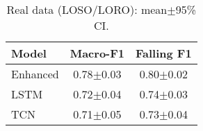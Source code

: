 \begin{table}[t]
\centering
\caption{Real data (LOSO/LORO): mean$\pm$95\% CI.}
\begin{tabular}{lcc}
\toprule
Model & Macro-F1 & Falling F1 \\
\midrule
Enhanced & 0.78$\pm$0.03 & 0.80$\pm$0.02 \\
LSTM & 0.72$\pm$0.04 & 0.74$\pm$0.03 \\
TCN & 0.71$\pm$0.05 & 0.73$\pm$0.04 \\
\bottomrule
\end{tabular}
\label{tab:main-real}
\end{table}
